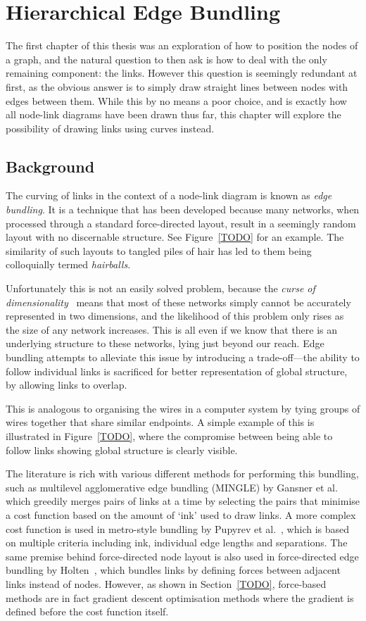 \chapter{Hierarchical Edge Bundling}
The first chapter of this thesis was an exploration of how to position the nodes of a graph, and the natural question to then ask is how to deal with the only remaining component: the links. However this question is seemingly redundant at first, as the obvious answer is to simply draw straight lines between nodes with edges between them. While this by no means a poor choice, and is exactly how all node-link diagrams have been drawn thus far, this chapter will explore the possibility of drawing links using curves instead.

\section{Background}
The curving of links in the context of a node-link diagram is known as \textit{edge bundling}. It is a technique that has been developed because many networks, when processed through a standard force-directed layout, result in a seemingly random layout with no discernable structure. See Figure~\ref{TODO} for an example. The similarity of such layouts to tangled piles of hair has led to them being colloquially termed \textit{hairballs}.

Unfortunately this is not an easily solved problem, because the \textit{curse of dimensionality}~\cite{TODO} means that most of these networks simply cannot be accurately represented in two dimensions, and the likelihood of this problem only rises as the size of any network increases. This is all even if we know that there is an underlying structure to these networks, lying just beyond our reach.
Edge bundling attempts to alleviate this issue by introducing a trade-off---the ability to follow individual links is sacrificed for better representation of global structure, by allowing links to overlap.

This is analogous to organising the wires in a computer system by tying groups of wires together that share similar endpoints. A simple example of this is illustrated in Figure~\ref{TODO}, where the compromise between being able to follow links showing global structure is clearly visible.

The literature is rich with various different methods for performing this bundling, such as multilevel agglomerative edge bundling (MINGLE) by Gansner et al.~\cite{TODO} which greedily merges pairs of links at a time by selecting the pairs that minimise a cost function based on the amount of `ink' used to draw links. A more complex cost function is used in metro-style bundling by Pupyrev et al.~\cite{TODO}, which is based on multiple criteria including ink, individual edge lengths and separations. 
The same premise behind force-directed node layout is also used in force-directed edge bundling by Holten~\cite{TODO}, which bundles links by defining forces between adjacent links instead of nodes. However, as shown in Section~\ref{TODO}, force-based methods are in fact gradient descent optimisation methods where the gradient is defined before the cost function itself.


